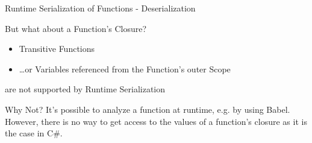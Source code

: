 \begin{frame}{Runtime Serialization of Functions - Deserialization}
\end{frame}

\begin{frame}{But what about a Function's Closure?}
\begin{itemize}
	\item Transitive Functions
	\item \dots or Variables referenced from the Function's outer Scope
\end{itemize}

are not supported by Runtime Serialization

\vfill 

\begin{block}{Why Not?}
It's possible to analyze a function at runtime, e.g. by using Babel. However, there is no way to get access to the values of a function's closure as it is the case in C\#. 	
\end{block}
\end{frame}

